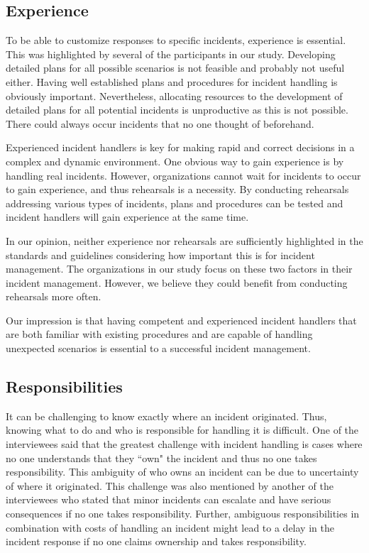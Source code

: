 \subsection{Experience}
\label{sec:experience}
To be able to customize responses to specific incidents, experience is essential. This was highlighted by several of the participants in our study. Developing detailed plans for all possible scenarios is not feasible and probably not useful either. Having well established plans and procedures for incident handling is obviously important. Nevertheless, allocating resources to the development of detailed plans for all potential incidents is unproductive as this is not possible. There could always occur incidents that no one thought of beforehand. 

Experienced incident handlers is key for making rapid and correct decisions in a complex and dynamic environment. One obvious way to gain experience is by handling real incidents. However, organizations cannot wait for incidents to occur to gain experience, and thus rehearsals is a necessity. By conducting rehearsals addressing various types of incidents, plans and procedures can be tested and incident handlers will gain experience at the same time. 

In our opinion, neither experience nor rehearsals are sufficiently highlighted in the standards and guidelines considering how important this is for incident management. The organizations in our study focus on these two factors in their incident management. However, we believe they could benefit from conducting rehearsals more often.

Our impression is that having competent and experienced incident handlers that are both familiar with existing procedures and are capable of handling unexpected scenarios is essential to a successful incident management.


\subsection{Responsibilities}
It can be challenging to know exactly where an incident originated. Thus, knowing what to do and who is responsible for handling it is difficult. One of the interviewees said that the greatest challenge with incident handling is cases where no one understands that they ``own" the incident and thus no one takes responsibility. This ambiguity of who owns an incident can be due to uncertainty of where it originated. This challenge was also mentioned by another of the interviewees who stated that minor incidents can escalate and have serious consequences if no one takes responsibility. Further, ambiguous responsibilities in combination with costs of handling an incident might lead to a delay in the incident response if no one claims ownership and takes responsibility. 

